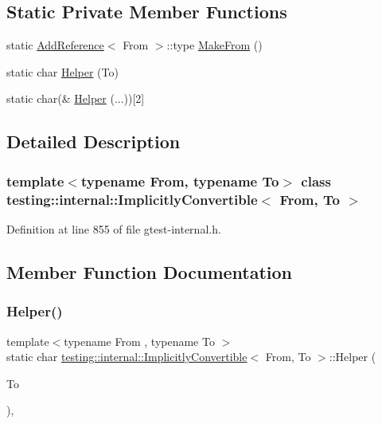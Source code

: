 \subsection*{Static Private Member Functions}
\begin{DoxyCompactItemize}
\item 
static \hyperlink{structtesting_1_1internal_1_1AddReference}{Add\+Reference}$<$ From $>$\+::type \hyperlink{classtesting_1_1internal_1_1ImplicitlyConvertible_adb692b091aebd0cde316c8c2c0ab661f}{Make\+From} ()
\item 
static char \hyperlink{classtesting_1_1internal_1_1ImplicitlyConvertible_a20029a4415e5f9ae152b8fce8b124980}{Helper} (To)
\item 
static char(\& \hyperlink{classtesting_1_1internal_1_1ImplicitlyConvertible_aba219f30a4cbba407d8141ce53fbfeb7}{Helper} (...))\mbox{[}2\mbox{]}
\end{DoxyCompactItemize}


\subsection{Detailed Description}
\subsubsection*{template$<$typename From, typename To$>$\newline
class testing\+::internal\+::\+Implicitly\+Convertible$<$ From, To $>$}



Definition at line 855 of file gtest-\/internal.\+h.



\subsection{Member Function Documentation}
\mbox{\label{classtesting_1_1internal_1_1ImplicitlyConvertible_a20029a4415e5f9ae152b8fce8b124980}} 
\subsubsection{\texorpdfstring{Helper()}{Helper()}\hspace{0.1cm}{\footnotesize\ttfamily [1/2]}}
{\footnotesize\ttfamily template$<$typename From , typename To $>$ \\
static char \hyperlink{classtesting_1_1internal_1_1ImplicitlyConvertible}{testing\+::internal\+::\+Implicitly\+Convertible}$<$ From, To $>$\+::Helper (\begin{DoxyParamCaption}\item[{To}]{ }\end{DoxyParamCaption})\hspace{0.3cm}{\ttfamily [static]}, {\ttfamily [private]}}

